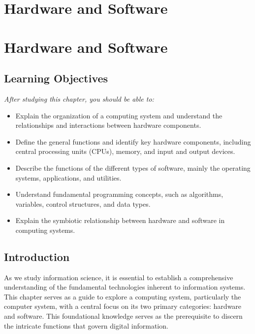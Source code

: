 \documentclass[
  letterpaper,
  DIV=11,
  numbers=noendperiod]{scrreprt}
\providecommand{\tightlist}{%
  \setlength{\itemsep}{0pt}\setlength{\parskip}{0pt}}\usepackage{longtable,booktabs,array}
\begin{document}

\chapter{Hardware and Software}\label{hardware-and-software}


\chapter{Hardware and Software}\label{hardware-and-software-1}

\section{Learning Objectives}\label{learning-objectives-1}

\emph{After studying this chapter, you should be able to:}

\begin{itemize}
\tightlist
\item
  Explain the organization of a computing system and understand the
  relationships and interactions between hardware components.
\item
  Define the general functions and identify key hardware components,
  including central processing units (CPUs), memory, and input and
  output devices.
\item
  Describe the functions of the different types of software, mainly the
  operating systems, applications, and utilities.
\item
  Understand fundamental programming concepts, such as algorithms,
  variables, control structures, and data types.
\item
  Explain the symbiotic relationship between hardware and software in
  computing systems.
\end{itemize}

\section{Introduction}\label{introduction-7}

As we study information science, it is essential to establish a
comprehensive understanding of the fundamental technologies inherent to
information systems. This chapter serves as a guide to explore a
computing system, particularly the computer system, with a central focus
on its two primary categories: hardware and software. This foundational
knowledge serves as the prerequisite to discern the intricate functions
that govern digital information.
\end{document}
